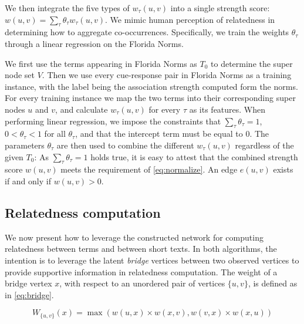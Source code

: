 \documentclass[letterpaper]{article}
\begin{document}
We then integrate the five types of $w_\tau(u, v)$ into a single
strength score: $w(u, v) = \sum_{\tau}\theta_\tau w_\tau(u, v)$. 
We mimic human perception of relatedness in
determining how to aggregate co-occurrences. Specifically, we train
the weights $\theta_\tau$ through a linear regression on
the Florida Norms.

We first use the terms appearing in Florida Norms as $T_0$ to 
determine the super node set $V$. 
Then we use every cue-response pair in Florida Norms as a training
instance, with the label being the association strength computed 
form the norms.  For every training instance we
map the two terms into their corresponding super nodes $u$ and $v$, and
calculate $w_\tau(u, v)$ for every $\tau$ as its features. When
performing linear regression, we impose the constraints that
$\sum_{\tau}\theta_\tau = 1$, $0< \theta_\tau < 1$ for all $\theta_\tau$, and
that the intercept term must be equal to 0. The
parameters $\theta_\tau$ are then used to combine the different $w_\tau(u, v)$
regardless of the given $T_0$: As $\sum_{\tau}\theta_\tau = 1$ holds true, it is
easy to attest that the combined strength score $w(u, v)$ meets
the requirement of \eqref{eq:normalize}. An edge $e(u, v)$ exists
if and only if $w(u, v)>0$.

\subsection{Relatedness computation}
\label{sec:relatedness}

We now present how to leverage the constructed network for computing
relatedness between terms and between short texts.  In both algorithms,
the intention is to leverage the latent {\em bridge} 
vertices between two observed vertices to provide supportive information 
in relatedness computation.
The weight of a bridge vertex $x$, with respect to an unordered pair of 
vertices $\{u, v\}$, is defined as in \eqref{eq:bridge}.

\begin{equation}
W_{\{u,v\}}(x) = \max(w(u,x)\times w(x,v), w(v,x)\times w(x,u))
\label{eq:bridge}
\end{equation}
\end{document}
